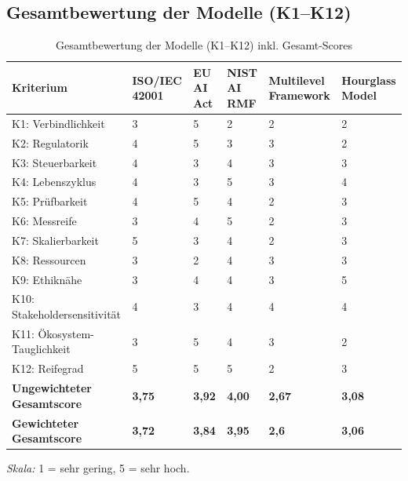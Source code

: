 \subsection{Gesamtbewertung der Modelle (K1–K12)}
\begin{table}[h]
  \centering
  \small
  \renewcommand{\arraystretch}{1.2}
  \begin{threeparttable}
    \caption{Gesamtbewertung der Modelle (K1–K12) inkl. Gesamt-Scores}
    \label{tab:gesamtmatrix}
    \begin{tabularx}{\textwidth}{@{}m{4cm} | m{1.5cm} | m{1.5cm} | m{1.5cm} | m{1.5cm} | m{1.5cm}@{}}
      \toprule
      \textbf{Kriterium} & \textbf{ISO/IEC 42001} & \textbf{EU AI Act} & \textbf{NIST AI RMF} & \textbf{Multilevel Framework} & \textbf{Hourglass Model} \\
      \midrule
      K1: Verbindlichkeit & 3 & 5 & 2 & 2 & 2 \\
      K2: Regulatorik & 4 & 5 & 3 & 3 & 2 \\
      K3: Steuerbarkeit & 4 & 3 & 4 & 3 & 3 \\
      K4: Lebenszyklus & 4 & 3 & 5 & 3 & 4 \\
      K5: Prüfbarkeit & 4 & 5 & 4 & 2 & 3 \\
      K6: Messreife & 3 & 4 & 5 & 2 & 3 \\
      K7: Skalierbarkeit & 5 & 3 & 4 & 2 & 3 \\
      K8: Ressourcen & 3 & 2 & 4 & 3 & 3 \\
      K9: Ethiknähe & 3 & 4 & 4 & 3 & 5 \\
      K10: Stakeholdersensitivität & 4 & 3 & 4 & 4 & 4 \\
      K11: Ökosystem-Tauglichkeit & 3 & 5 & 4 & 3 & 2 \\
      K12: Reifegrad & 5 & 5 & 5 & 2 & 3 \\
      \midrule
      \textbf{Ungewichteter Gesamtscore}                & \textbf{3,75} & \textbf{3,92} & \textbf{4,00} & \textbf{2,67} & \textbf{3,08} \\
      \textbf{Gewichteter Gesamtscore}             & \textbf{3,72} & \textbf{3,84} & \textbf{3,95} & \textbf{2,6} & \textbf{3,06} \\
      \bottomrule
    \end{tabularx}
    \begin{tablenotes}[flushleft]
      \footnotesize
      \item \textit{Skala:} 1 = sehr gering, 5 = sehr hoch.
    \end{tablenotes}
  \end{threeparttable}
\end{table}

